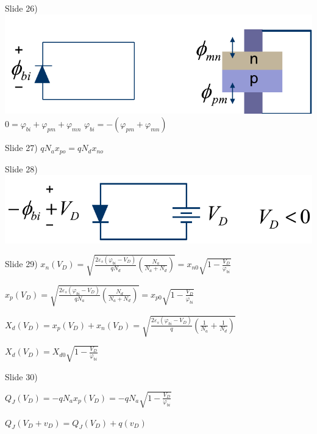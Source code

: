 \documentclass{beamer}
\begin{document}
 \begin{frame}{Slide 26)}
\includegraphics[width=.6\columnwidth]{slide26}
$0 = {\varphi _{bi}} + {\varphi _{pm}} + {\varphi _{mn}}$
${\varphi _{bi}} =  - ({\varphi _{pm}} + {\varphi _{mn}})$

 \end{frame}

 \begin{frame}{Slide 27)}
$q{N_a}{x_{po}} = q{N_d}{x_{no}}$
 \end{frame}

 \begin{frame}{Slide 28)}
\includegraphics[width=.6\columnwidth]{slide28}
 \end{frame}
 
 \begin{frame}{Slide 29)}
 ${x_n}({V_D}) = \sqrt {\frac{{2{\varepsilon _s}({\varphi _{bi}} - {V_D})}}{{q{N_d}}}\left( {\frac{{{N_a}}}{{{N_a} + {N_d}}}} \right)}  = {x_{n0}}\sqrt {1 - \frac{{{V_D}}}{{{\varphi _{bi}}}}} $
 
 ${x_p}({V_D}) = \sqrt {\frac{{2{\varepsilon _s}({\varphi _{bi}} - {V_D})}}{{q{N_a}}}\left( {\frac{{{N_d}}}{{{N_a} + {N_d}}}} \right)}  = {x_{p0}}\sqrt {1 - \frac{{{V_D}}}{{{\varphi _{bi}}}}} $
 
 ${X_d}({V_D}) = {x_p}({V_D}) + {x_n}({V_D}) = \sqrt {\frac{{2{\varepsilon _s}({\varphi _{bi}} - {V_D})}}{q}\left( {\frac{1}{{{N_a}}} + \frac{1}{{{N_d}}}} \right)} $
 
 ${X_d}({V_D}) = {X_{d0}}\sqrt {1 - \frac{{{V_D}}}{{{\varphi _{bi}}}}} $
 
 \end{frame}
 
\begin{frame}{Slide 30)}

${Q_J}({V_D}) =  - q{N_a}{x_p}({V_D}) =  - q{N_a}\sqrt {1 - \frac{{{V_D}}}{{{\varphi _{bi}}}}} $

${Q_J}({V_D} + {v_D}) = {Q_J}({V_D}) + q({v_D})$

\end{frame}
\end{document}
